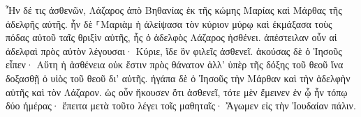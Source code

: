 \documentclass{openreader}
\begin{document}
Ἦν δέ τις ἀσθενῶν, Λάζαρος ἀπὸ Βηθανίας ἐκ τῆς κώμης Μαρίας καὶ Μάρθας τῆς ἀδελφῆς αὐτῆς. 
ἦν δὲ ⸀Μαριὰμ ἡ ἀλείψασα τὸν κύριον μύρῳ καὶ ἐκμάξασα τοὺς πόδας αὐτοῦ ταῖς θριξὶν αὐτῆς, ἧς ὁ ἀδελφὸς Λάζαρος ἠσθένει. 
ἀπέστειλαν οὖν αἱ ἀδελφαὶ πρὸς αὐτὸν λέγουσαι· Κύριε, ἴδε ὃν φιλεῖς ἀσθενεῖ. 
ἀκούσας δὲ ὁ Ἰησοῦς εἶπεν· Αὕτη ἡ ἀσθένεια οὐκ ἔστιν πρὸς θάνατον ἀλλ’ ὑπὲρ τῆς δόξης τοῦ θεοῦ ἵνα δοξασθῇ ὁ υἱὸς τοῦ θεοῦ δι’ αὐτῆς. 
ἠγάπα δὲ ὁ Ἰησοῦς τὴν Μάρθαν καὶ τὴν ἀδελφὴν αὐτῆς καὶ τὸν Λάζαρον. 
ὡς οὖν ἤκουσεν ὅτι ἀσθενεῖ, τότε μὲν ἔμεινεν ἐν ᾧ ἦν τόπῳ δύο ἡμέρας· 
ἔπειτα μετὰ τοῦτο λέγει τοῖς μαθηταῖς· Ἄγωμεν εἰς τὴν Ἰουδαίαν πάλιν. 
\end{document}
